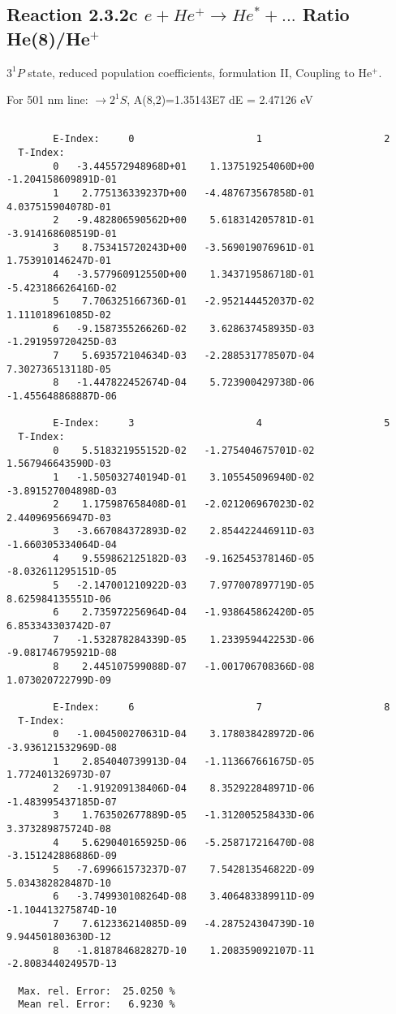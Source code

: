 \documentclass[12pt]{article}
\begin{document}
\subsection{
  Reaction 2.3.2c $e + He^+ \rightarrow He^* + ... $ Ratio He(8)/He$^+$
}

  $3^1P$ state,
  reduced population coefficients, formulation II,
  Coupling to He$^+$.

  For 501 nm line: $\rightarrow 2^1S$, A(8,2)=1.35143E7 dE = 2.47126 eV

\begin{small}\begin{verbatim}

        E-Index:     0                     1                     2
  T-Index:
        0   -3.445572948968D+01    1.137519254060D+00   -1.204158609891D-01
        1    2.775136339237D+00   -4.487673567858D-01    4.037515904078D-01
        2   -9.482806590562D+00    5.618314205781D-01   -3.914168608519D-01
        3    8.753415720243D+00   -3.569019076961D-01    1.753910146247D-01
        4   -3.577960912550D+00    1.343719586718D-01   -5.423186626416D-02
        5    7.706325166736D-01   -2.952144452037D-02    1.111018961085D-02
        6   -9.158735526626D-02    3.628637458935D-03   -1.291959720425D-03
        7    5.693572104634D-03   -2.288531778507D-04    7.302736513118D-05
        8   -1.447822452674D-04    5.723900429738D-06   -1.455648868887D-06

        E-Index:     3                     4                     5
  T-Index:
        0    5.518321955152D-02   -1.275404675701D-02    1.567946643590D-03
        1   -1.505032740194D-01    3.105545096940D-02   -3.891527004898D-03
        2    1.175987658408D-01   -2.021206967023D-02    2.440969566947D-03
        3   -3.667084372893D-02    2.854422446911D-03   -1.660305334064D-04
        4    9.559862125182D-03   -9.162545378146D-05   -8.032611295151D-05
        5   -2.147001210922D-03    7.977007897719D-05    8.625984135551D-06
        6    2.735972256964D-04   -1.938645862420D-05    6.853343303742D-07
        7   -1.532878284339D-05    1.233959442253D-06   -9.081746795921D-08
        8    2.445107599088D-07   -1.001706708366D-08    1.073020722799D-09

        E-Index:     6                     7                     8
  T-Index:
        0   -1.004500270631D-04    3.178038428972D-06   -3.936121532969D-08
        1    2.854040739913D-04   -1.113667661675D-05    1.772401326973D-07
        2   -1.919209138406D-04    8.352922848971D-06   -1.483995437185D-07
        3    1.763502677889D-05   -1.312005258433D-06    3.373289875724D-08
        4    5.629040165925D-06   -5.258717216470D-08   -3.151242886886D-09
        5   -7.699661573237D-07    7.542813546822D-09    5.034382828487D-10
        6   -3.749930108264D-08    3.406483389911D-09   -1.104413275874D-10
        7    7.612336214085D-09   -4.287524304739D-10    9.944501803630D-12
        8   -1.818784682827D-10    1.208359092107D-11   -2.808344024957D-13

  Max. rel. Error:  25.0250 %
  Mean rel. Error:   6.9230 %


\end{verbatim}\end{small}
\end{document}
